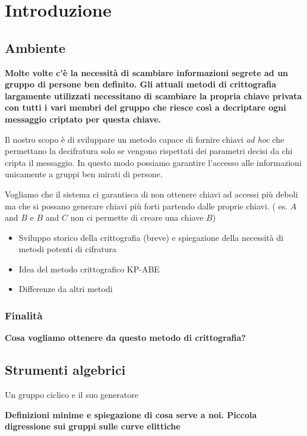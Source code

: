 \chapter{Introduzione}
\section{Ambiente}


{\bfseries
Molte volte c'è la necessità di scambiare informazioni segrete ad un gruppo di persone ben definito. Gli attuali metodi di crittografia largamente utilizzati necessitano di scambiare la propria chiave privata con tutti i vari membri del gruppo che riesce così a decriptare ogni messaggio criptato per questa chiave.

Il nostro scopo è di sviluppare un metodo capace di fornire chiavi \emph{ad hoc} che permettano la decifratura solo se vengono rispettati dei parametri decisi da chi cripta il messaggio. In questo modo possiamo garantire l'accesso alle informazioni unicamente a gruppi ben mirati di persone.

Vogliamo che il sistema ci garantisca di non ottenere chiavi ad accessi più deboli ma che si possano generare chiavi più forti partendo dalle proprie chiavi. ( es. $A $and $B$ e $B$ and $C$ non ci permette di creare una chiave $B$)
 
\begin{itemize}
\item Sviluppo storico della crittografia (breve) e spiegazione della necessità di metodi potenti di cifratura
\item Idea del metodo crittografico KP-ABE
\item Differenze da altri metodi
\end{itemize}}

\subsection{Finalità} 

\textbf{Cosa vogliamo ottenere da questo metodo di crittografia?}



\section{Strumenti algebrici}
\begin{defi}
Un gruppo ciclico e il suo generatore
\end{defi}
\textbf{Definizioni minime e spiegazione di cosa serve a noi. Piccola digressione sui gruppi sulle curve elittiche}

